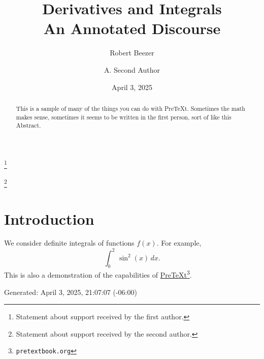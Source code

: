 \documentclass{amsart}
\theoremstyle{plain}%
\theoremstyle{definition}%
\theoremstyle{remark}%
\numberwithin{equation}{section}
\newcommand{\definiteintegral}[4]{\int_{#1}^{#2}\,#3\,d#4}
\begin{document}
%
\title[Derivatives and Integrals]{Derivatives and Integrals\\
{\small An Annotated Discourse}}
\author{Robert Beezer}
\address{Department of Mathematics and Computer Science\\
University of Puget Sound\\
Tacoma, Washington, USA
}
\thanks{Statement about support received by the first author.}
\author{A. Second Author}
\address{Department of Mathematics\\
University of Somewhere\\
Anytown, USA
}
\thanks{Statement about support received by the second author.}
\date{April 3, 2025}
\begin{abstract}
This is a sample of many of the things you can do with PreTeXt.  Sometimes the math makes sense, sometimes it seems to be written in the first person, sort of like this Abstract.%
\end{abstract}
\maketitle
%
%
\typeout{************************************************}
\typeout{************************************************}
%
\section{Introduction}\label{section-introduction}%
We consider definite integrals of functions \(f(x)\).  For example,%
\begin{equation*}
\definiteintegral{0}{2}{\sin^2(x)}{x}\text{.}
\end{equation*}
This is also a demonstration of the capabilities of \href{https://pretextbook.org}{PreTeXt}\footnote{\nolinkurl{pretextbook.org}\label{section-introduction-2-4}}.\label{section-introduction-2-5}%
\par
Generated: April 3, 2025, 21:07:07 (-06:00)%
%
%
\typeout{************************************************}
\typeout{************************************************}
%
\end{document}
